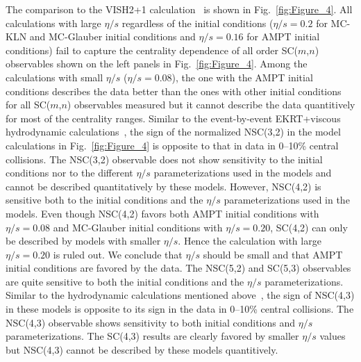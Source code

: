 The comparison to the VISH2+1 calculation~\cite{Zhu:2016puf} is shown in Fig.~\ref{fig:Figure_4}.  All calculations with large $\eta/s$ regardless of the initial conditions ($\eta/s=0.2$ for MC-KLN and MC-Glauber initial conditions and $\eta/s=0.16$ for AMPT initial conditions) fail to capture the centrality dependence of all order SC($m$,$n$) observables shown on the left panels in Fig.~\ref{fig:Figure_4}.
Among the calculations with small $\eta/s$ ($\eta/s=0.08$), the one with the AMPT initial conditions describes the data better than the ones with other initial conditions for all SC($m$,$n$) observables measured but it cannot describe the data quantitively for most of the centrality ranges.
Similar to the event-by-event EKRT+viscous hydrodynamic calculations~\cite{Niemi:2015qia}, the sign of the normalized NSC(3,2) in the model calculations in Fig.~\ref{fig:Figure_4} is opposite to that in data in 0--10\% central collisions. The NSC(3,2) observable does not show sensitivity to the initial conditions nor to the different $\eta/s$ parameterizations used in the models and cannot be described quantitatively by these models.
However, NSC(4,2) is sensitive both to the initial conditions and the $\eta/s$ parameterizations used in the models.
Even though NSC(4,2) favors both AMPT initial conditions with $\eta/s=0.08$ and MC-Glauber initial conditions with $\eta/s=0.20$,
SC(4,2) can only be described by models with smaller $\eta/s$. Hence the calculation with large $\eta/s=0.20$ is ruled out. We conclude that $\eta/s$ should be small and that AMPT initial conditions are favored by the data.
The NSC(5,2) and SC(5,3) observables are quite sensitive to both the initial conditions and the $\eta/s$ parameterizations.
Similar to the hydrodynamic calculations mentioned above~\cite{Niemi:2015qia}, the sign of NSC(4,3) in these models is opposite to its sign in the data in 0--10\% central collisions. The NSC(4,3) observable shows sensitivity to both initial conditions and $\eta/s$ parameterizations.
The SC(4,3) results are clearly favored by smaller $\eta/s$ values but NSC(4,3) cannot be described by these models quantitively.

